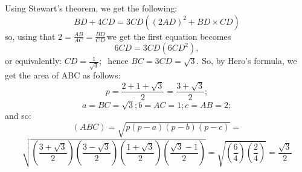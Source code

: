 \documentclass{book}
\begin{document}
	Using Stewart's theorem, we get the following:
	$$
		BD+4CD=3CD((2AD)^2+BD \times CD)
	$$
	so, using that $2=\frac{AB}{AC}=\frac{BD}{CD}\,$we get
	the first equation becomes
	$$
		6CD=3CD(6CD^2),
	$$
	or equivalently: $CD=\frac{1}{\sqrt{3}};\;\;$hence $BC=3CD=\sqrt{3}.$
	So, by Hero's formula, we get the area of ABC as follows:
	$$
		 p=\frac{2+1+\sqrt{3}}{2}=\frac{3+\sqrt{3}}{2};
	$$
	$$
		 a=BC=\sqrt{3}; b=AC=1; c=AB=2;
	$$
	and so:
	$$
		(ABC)=\sqrt{p(p-a)(p-b)(p-c)}=
	$$
	$$
		\sqrt{\left(\frac{3+\sqrt{3}}{2}\right)\left(\frac{3-\sqrt{3}}{2}\right)\left(\frac{1+\sqrt{3}}{2}\right)\left(\frac{\sqrt{3}-1}{2}\right)}=								\sqrt{\left(\frac{6}{4}\right)\left(\frac{2}{4}\right)}=\frac{\sqrt{3}}{2}
	$$
\end{document}
